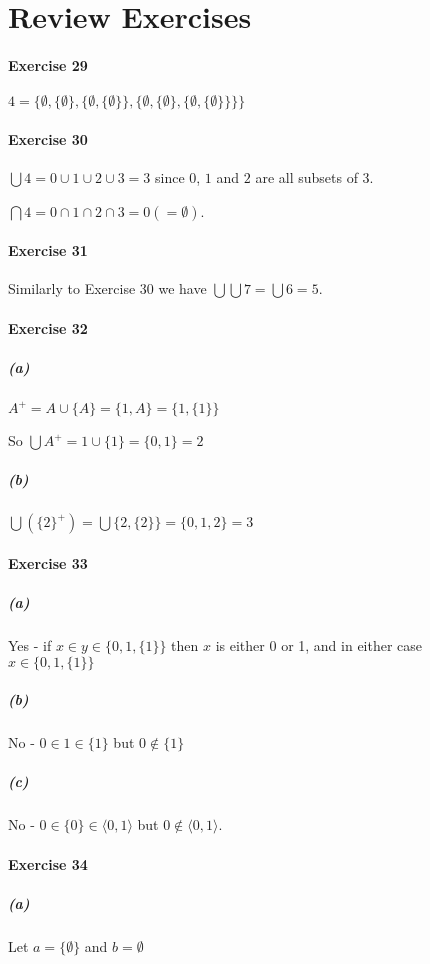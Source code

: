 \documentclass{report}
\begin{document}
    \section{Review Exercises}

    \paragraph{Exercise 29}
    $4 = \{ \emptyset, \{ \emptyset \}, \{ \emptyset, \{ \emptyset \} \},
        \{ \emptyset, \{ \emptyset \}, \{ \emptyset, \{ \emptyset \} \} \} \}$

    \paragraph{Exercise 30}
    $\bigcup 4 = 0 \cup 1 \cup 2 \cup 3 = 3$ since $0$, $1$ and $2$ are all subsets of 3.

    $\bigcap 4 = 0 \cap 1 \cap 2 \cap 3 = 0 (= \emptyset)$.

    \paragraph{Exercise 31}
    Similarly to Exercise 30 we have $\bigcup \bigcup 7 = \bigcup 6 = 5$.

    \paragraph{Exercise 32}
    \subparagraph{(a)}
    $A^+ = A \cup \{ A \} = \{ 1, A \} = \{ 1, \{ 1 \} \}$

    So $\bigcup A^+ = 1 \cup \{ 1 \} = \{ 0, 1 \} = 2$

    \subparagraph{(b)}
    $\bigcup (\{2\}^+) = \bigcup \{ 2, \{ 2 \} \} = \{ 0, 1, 2 \} = 3$

    \paragraph{Exercise 33}
    \subparagraph{(a)}
    Yes - if $x \in y \in \{ 0, 1, \{ 1 \} \}$ then $x$ is either 0 or 1, and in either case
    $x \in \{ 0, 1, \{ 1 \} \}$

    \subparagraph{(b)}
    No - $0 \in 1 \in \{ 1 \}$ but $0 \notin \{ 1 \}$

    \subparagraph{(c)}
    No - $0 \in \{ 0 \} \in \langle 0,1 \rangle$ but $0 \notin \langle 0,1 \rangle$.

    \paragraph{Exercise 34}
    \subparagraph{(a)}
    Let $a = \{ \emptyset \}$ and $b = \emptyset$
\end{document}

